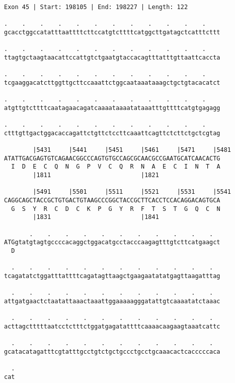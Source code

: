 \documentclass{article}
\begin{document}
\begin{Verbatim}
Exon 45 | Start: 198105 | End: 198227 | Length: 122
 
.    .    .    .    .    .    .    .    .    .    .    .    
gcacctggccatatttaattttcttccatgtcttttcatggcttgatagctcatttcttt
  
.    .    .    .    .    .    .    .    .    .    .    .    
ttagtgctaagtaacattccattgtctgaatgtaccacagtttatttgttaattcaccta
  
.    .    .    .    .    .    .    .    .    .    .    .    
tcgaaggacatcttggttgcttccaaattctggcaataaataaagctgctgtacacatct
  
.    .    .    .    .    .    .    .    .    .    .    .    
atgttgtcttttcaatagaacagatcaaaataaaatataaatttgttttcatgtgagagg
  
.    .    .    .    .    .    .    .    .    .    .    .    
ctttgttgactggacaccagattctgttctccttcaaattcagttctcttctgctcgtag
  
        |5431     |5441     |5451     |5461     |5471     |5481
ATATTGACGAGTGTCAGAACGGCCCAGTGTGCCAGCGCAACGCCGAATGCATCAACACTG
  I  D  E  C  Q  N  G  P  V  C  Q  R  N  A  E  C  I  N  T  A
        |1811                         |1821                 
  
        |5491     |5501     |5511     |5521     |5531     |5541
CAGGCAGCTACCGCTGTGACTGTAAGCCCGGCTACCGCTTCACCTCCACAGGACAGTGCA
  G  S  Y  R  C  D  C  K  P  G  Y  R  F  T  S  T  G  Q  C  N
        |1831                         |1841                 
  
       .    .    .    .    .    .    .    .    .    .    .  
ATGgtatgtagtgccccacaggctggacatgcctacccaagagtttgtcttcatgaagct
  D                                                         
  
  .    .    .    .    .    .    .    .    .    .    .    .  
tcagatatctggatttattttcagatagttaagctgaagaatatatgagttaagatttag
  
  .    .    .    .    .    .    .    .    .    .    .    .  
attgatgaactctaatattaaactaaattggaaaaagggatattgtcaaaatatctaaac
  
  .    .    .    .    .    .    .    .    .    .    .    .  
acttagctttttaatcctctttctggatgagatattttcaaaacaagaagtaaatcattc
  
  .    .    .    .    .    .    .    .    .    .    .    .  
gcatacatagatttcgtatttgcctgtctgctgccctgcctgcaaacactcacccccaca
  
  .
cat
\end{Verbatim}
\newpage
\end{document}
